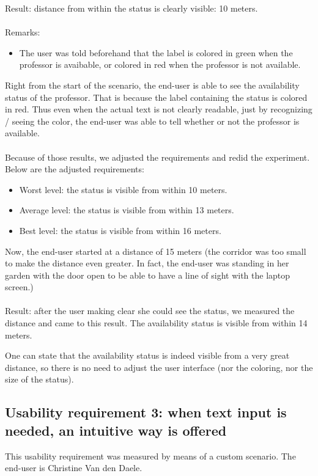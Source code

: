 \documentclass[11pt, a4paper,svglistings]{report}
\begin{document}
Result: distance from within the status is clearly visible: 10 meters. \\ \\
Remarks:
\begin{itemize}
\item The user was told beforehand that the label is colored in green when the professor is avaibable, or colored in red when the professor is not available.
\end{itemize}
Right from the start of the scenario, the end-user is able to see the availability status of the professor. That is because the label containing the status is colored in red. Thus even when the actual text is not clearly readable, just by recognizing / seeing the color, the end-user was able to tell whether or not the professor is available. \\ \\
Because of those results, we adjusted the requirements and redid the experiment. Below are the adjusted requirements:
\begin{itemize}
\item Worst level: the status is visible from within 10 meters.
\item Average level: the status is visible from within 13 meters.
\item Best level: the status is visible from within 16 meters.
\end{itemize}
Now, the end-user started at a distance of 15 meters (the corridor was too small to make the distance even greater. In fact, the end-user was standing in her garden with the door open to be able to have a line of sight with the laptop screen.) \\ \\
Result: after the user making clear she could see the status, we measured the distance and came to this result. The availability status is visible from within 14 meters.

One can state that the availability status is indeed visible from a very great distance, so there is no need to adjust the user interface (nor the coloring, nor the size of the status).


\newpage
 
\subsection{Usability requirement 3: when text input is needed, an intuitive way is offered}

This usability requirement was measured by means of a custom scenario. The end-user is Christine Van den Daele.
\end{document}

